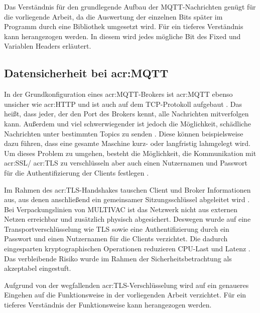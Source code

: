         Das Verständnis für den grundlegende Aufbau der MQTT-Nachrichten genügt für die vorliegende Arbeit, da die Auswertung der einzelnen Bits später im Programm durch eine Bibliothek umgesetzt wird. Für ein tieferes Verständnis kann \autocite{oasisMQTTVersion502019} herangezogen werden. In diesem wird jedes mögliche Bit des Fixed und Variablen Headers erläutert.
   
    \subsection{Datensicherheit bei \acrshort{acr:MQTT}}
        In der Grundkonfiguration eines \acrshort{acr:MQTT}-Brokers ist \acrshort{acr:MQTT} ebenso unsicher wie \gls{acr:HTTP} und ist auch auf dem TCP-Protokoll aufgebaut  \autocite[2]{Imran}. 
        Das heißt, dass jeder, der den Port des Brokers kennt, alle Nachrichten mitverfolgen kann.
        Außerdem und viel schwerwiegender ist jedoch die Möglichkeit, schädliche Nachrichten unter bestimmten Topics zu senden \autocite[2]{venancioSecurityAnalysisCommunication2026}. Diese können beispielsweise dazu führen, dass eine gesamte Maschine kurz- oder langfristig lahmgelegt wird. Um dieses Problem zu umgehen, besteht die Möglichkeit, die Kommunikation mit \gls{acr:SSL}/ \gls{acr:TLS} zu verschlüsseln \autocite{SecurityFeaturesHiveMQ} aber auch einen Nutzernamen und Passwort für die Authentifizierung der Clients festlegen \autocite[2]{venancioSecurityAnalysisCommunication2026}.

        Im Rahmen des \acrshort{acr:TLS}-Handshakes tauschen Client und Broker Informationen aus, aus denen anschließend ein gemeinsamer Sitzungsschlüssel abgeleitet wird \autocite[5--7]{tslsslKastning}.
        Bei Verpackungslinien von MULTIVAC ist das Netzwerk nicht aus externen Netzen erreichbar und zusätzlich physisch abgesichert. Deswegen wurde auf eine Transportverschlüsselung wie TLS sowie eine Authentifizierung durch ein Passwort und einen Nutzernamen für die Clients verzichtet. Die dadurch eingesparten kryptographischen Operationen reduzieren CPU-Last und Latenz \autocite[9--10]{kant}. Das verbleibende Risiko wurde im Rahmen der Sicherheitsbetrachtung als akzeptabel eingestuft.

        Aufgrund von der wegfallenden \gls{acr:TLS}-Verschlüsselung wird auf ein genaueres Eingehen auf die Funktionsweise in der vorliegenden Arbeit verzichtet. Für ein tieferes Verständnis der Funktionsweise kann \autocite{tslsslKastning} herangezogen werden.

